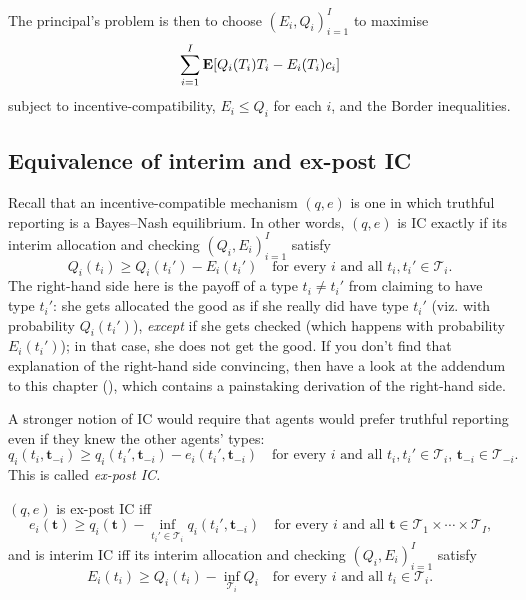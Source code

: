 The principal's problem is then to choose $(E_i,Q_i)_{i=1}^I$ to maximise
%
\begin{equation*}
	\sum_{i=1}^I \E\left[ Q_i(T_i) T_i - E_i(T_i) c_i \right]
\end{equation*}
%
subject to incentive-compatibility,
$E_i \leq Q_i$ for each $i$,
and the Border inequalities.



\subsection{Equivalence of interim and ex-post IC}
\label{sec:ch2:bdl14:bic_epic}

Recall that an incentive-compatible mechanism $(q,e)$ is one in which truthful reporting is a Bayes--Nash equilibrium.
In other words, $(q,e)$ is IC exactly if its interim allocation and checking $(Q_i,E_i)_{i=1}^I$ satisfy
%
\begin{equation*}
	Q_i(t_i) \geq Q_i(t_i') - E_i(t_i')
	\quad \text{for every $i$ and all $t_i,t_i' \in \mathcal{T}_i$.}
\end{equation*}
%
The right-hand side here is the payoff of a type $t_i \neq t_i'$ from claiming to have type $t_i'$:
she gets allocated the good as if she really did have type $t_i'$ (viz. with probability $Q_i(t_i')$), \emph{except} if she gets checked (which happens with probability $E_i(t_i')$); in that case, she does not get the good.
If you don't find that explanation of the right-hand side convincing, then have a look at the addendum to this chapter (), which contains a painstaking derivation of the right-hand side.

A stronger notion of IC would require that agents would prefer truthful reporting even if they knew the other agents' types:
%
\begin{equation*}
	q_i(t_i,\boldsymbol{t}_{-i}) 
	\geq q_i(t_i',\boldsymbol{t}_{-i}) - e_i(t_i',\boldsymbol{t}_{-i})
	\quad \text{for every $i$ and all $t_i,t_i' \in \mathcal{T}_i$, $\boldsymbol{t}_{-i} \in \mathcal{T}_{-i}$.}
\end{equation*}
%
This is called \emph{ex-post IC.}

\begin{lemma}
	\label{lemma:bdl_epic}
	$(q,e)$ is ex-post IC iff
	\begin{equation*}
		e_i(\boldsymbol{t})
		\geq q_i(\boldsymbol{t})
		- \inf_{t_i' \in \mathcal{T}_i}
		q_i(t_i',\boldsymbol{t}_{-i})
		\quad \text{for every $i$ and all $\boldsymbol{t} \in \mathcal{T}_1 \times \cdots \times \mathcal{T}_I$,}
	\end{equation*}
	and is interim IC iff its interim allocation and checking $(Q_i,E_i)_{i=1}^I$ satisfy
	\begin{equation*}
		E_i(t_i)
		\geq Q_i(t_i) - \inf_{\mathcal{T}_i} Q_i
		\quad \text{for every $i$ and all $t_i \in \mathcal{T}_i$.}
	\end{equation*}
\end{lemma}

